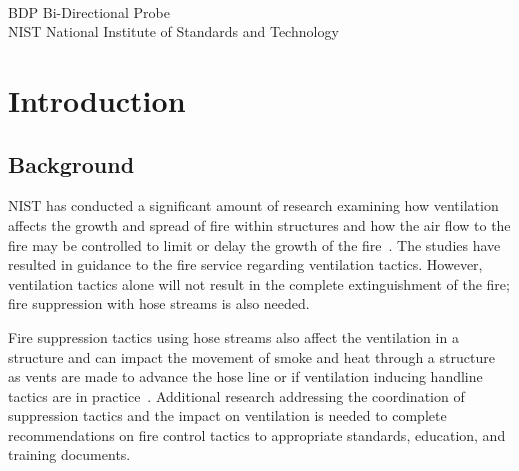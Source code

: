 \documentclass[12pt,oneside]{book}
\begin{document}
\begin{tabbing}
\hspace{1.5in} \= \\
BDP \> Bi-Directional Probe \\
NIST \> National Institute of Standards and Technology \\
\end{tabbing}

\newpage


\mainmatter


\chapter{Introduction}
\label{chap:intro}
\section{Background}
\label{sec:background}

NIST has conducted a significant amount of research examining how ventilation affects the growth and spread of fire within structures and how the air flow to the fire may be controlled to limit or delay the growth of the fire~\cite{}. The studies have resulted in guidance to the fire service regarding ventilation tactics. However, ventilation tactics alone will not result in the complete extinguishment of the fire; fire suppression with hose streams is also needed.

Fire suppression tactics using hose streams also affect the ventilation in a structure and can impact the movement of smoke and heat through a structure as vents are made to advance the hose line or if ventilation inducing handline tactics are in practice~\cite{}. Additional research addressing the coordination of suppression tactics and the impact on ventilation is needed to complete recommendations on fire control tactics to appropriate standards, education, and training documents.
\end{document}
